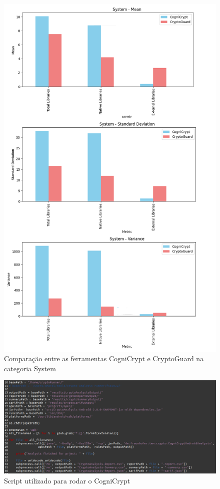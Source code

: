 \begin{figure}[!ht]
    \centering
    \includegraphics[scale=0.6]{img/plot_cc_x_cg_system.png}
    \caption{Comparação entre as ferramentas CogniCrypt e CryptoGuard na categoria System}
    \label{img: CCvsCG_System}
\end{figure}


\FloatBarrier


\begin{figure}[!ht]
  \centering
  \includegraphics[scale=0.4]{img/cognicrypt_script.png}
  \caption{Script utilizado para rodar o CogniCrypt}
  \label{img: cognicrypt_script}
\end{figure}

